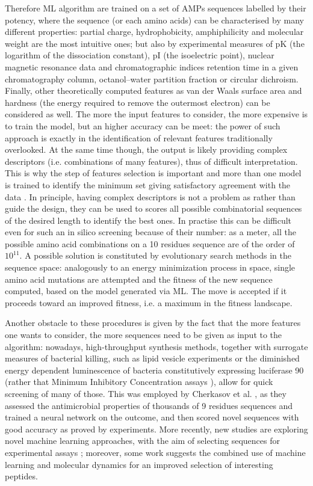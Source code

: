 Therefore ML algorithm are trained on a set of AMPs sequences labelled by their potency, where the sequence (or each amino acids) can be characterised by many different properties: partial charge, hydrophobicity, amphiphilicity and molecular weight are the most intuitive ones; but also by experimental measures of pK (the logarithm of the dissociation constant), pI (the isoelectric point), nuclear magnetic resonance data and chromatographic indices retention time in a given chromatography column, octanol–water partition fraction or circular dichroism. Finally, other theoretically computed features as van der Waals surface area and hardness (the energy required to remove the outermost electron) can be considered as well.
%
The more the input features to consider, the more expensive is to train the model, but an higher accuracy can be meet: the power of such approach is exactly in the identification of relevant features traditionally overlooked. At the same time though, the output is likely providing complex descriptors (i.e. combinations of many features), thus of difficult interpretation. This is why the step of features selection is important and more than one model is trained to identify the minimum set giving satisfactory agreement with the data \cite{Walters2005,Gonzalez2008}.
%
In principle, having complex descriptors is not a problem as rather than guide the design, they can be used to scores all possible combinatorial sequences of the desired length to identify the best ones. In practise this can be difficult even for such an in silico screening because of their number: as a meter, all the possible amino acid combinations on a 10 residues sequence are of the order of $10^{11}$.
%
A possible solution is constituted by evolutionary search methods in the sequence space: analogously to an energy minimization process in space, single amino acid mutations are attempted and the fitness of the new sequence computed, based on the model generated via ML. The move is accepted if it proceeds toward an improved fitness, i.e. a maximum in the fitness landscape.

Another obstacle to these procedures is given by the fact that the more features one wants to consider, the more sequences need to be given as input to the algorithm: nowadays, high-throughput synthesis methods, together with surrogate measures of bacterial killing, such as lipid vesicle experiments \cite{Wimley2010} or the diminished energy ­dependent luminescence of bacteria constitutively expressing luciferase 90 (rather that Minimum Inhibitory Concentration assays \cite{Lewenza2005}), allow for quick screening of many of those.
%
This was employed by Cherkasov et al. \cite{Cherkasov2009}, as they assessed the antimicrobial properties of thousands of 9 residues sequences and trained a neural network on the outcome, and then scored novel sequences with good accuracy as proved by experiments.
%
More recently, new studies are exploring novel machine learning approaches, with the aim of selecting sequences for experimental assays \cite{Lee2017}; moreover, some work suggests the combined use of machine learning and molecular dynamics for an improved selection of interesting peptides.


